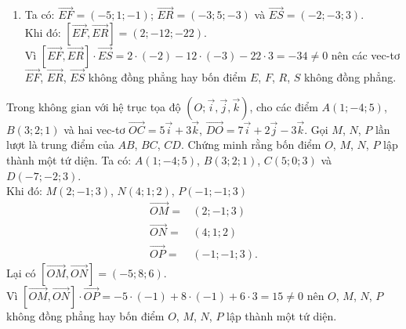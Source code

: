 \begin{bt}
{\begin{enumerate}
			\item Ta có: $\overrightarrow{EF} = (-5;1;-1)$; $\overrightarrow{ER} = (-3;5;-3)$ và $\overrightarrow{ES} = (-2;-3;3)$.\\
			Khi đó: $\left[ \overrightarrow{EF},\overrightarrow{ER} \right] = (2;-12;-22)$.\\
			Vì $\left[ \overrightarrow{EF},\overrightarrow{ER} \right] \cdot \overrightarrow{ES} = 2 \cdot (-2) - 12 \cdot (-3) - 22 \cdot 3 = -34 \neq 0$ nên các vec-tơ $\overrightarrow{EF}$, $\overrightarrow{ER}$, $\overrightarrow{ES}$ không đồng phẳng hay bốn điểm $E$, $F$, $R$, $S$ không đồng phẳng.
		\end{enumerate}
	}
\end{bt}


\begin{bt}%
	Trong không gian với hệ trục tọa độ $\left(O;\vec{i}, \vec{j}, \vec{k} \right)$, cho các điểm $A(1;-4;5)$, $B(3;2;1)$ và hai vec-tơ $\overrightarrow{OC} = 5\vec{i} + 3\vec{k}$, $\overrightarrow{DO} = 7\vec{i} + 2\vec{j} - 3\vec{k}$. Gọi $M$, $N$, $P$ lần lượt là trung điểm của $AB$, $BC$, $CD$. Chứng minh rằng bốn điểm $O$, $M$, $N$, $P$ lập thành một tứ diện.
	\loigiai
	{
		Ta có: $A(1;-4;5)$, $B(3;2;1)$, $C(5;0;3)$ và $D(-7;-2;3)$.\\
		Khi đó: $M(2;-1;3)$, $N(4;1;2)$, $P(-1;-1;3)$
		\begin{align*}
		\overrightarrow{OM} = &(2;-1;3)\\
		\overrightarrow{ON} = &(4;1;2)\\
		\overrightarrow{OP} = &(-1;-1;3).
		\end{align*}
		Lại có $\left[ \overrightarrow{OM}, \overrightarrow{ON} \right] = (-5;8;6)$.\\
		Vì $\left[ \overrightarrow{OM}, \overrightarrow{ON} \right] \cdot \overrightarrow{OP} = -5 \cdot (-1) + 8 \cdot (-1) + 6 \cdot 3 = 15 \neq 0$ nên $O$, $M$, $N$, $P$ không đồng phẳng hay bốn điểm $O$, $M$, $N$, $P$ lập thành một tứ diện.
	}
\end{bt}


